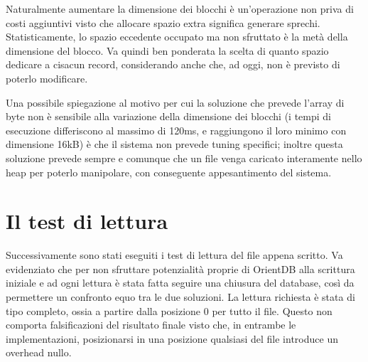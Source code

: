 Naturalmente aumentare la dimensione dei blocchi è un'operazione non priva di costi aggiuntivi visto che allocare spazio extra significa generare sprechi. Statisticamente, lo spazio eccedente occupato ma non sfruttato è la metà della dimensione del blocco. Va quindi ben ponderata la scelta di quanto spazio dedicare a cisacun record, considerando anche che, ad oggi, non è previsto di poterlo modificare.

Una possibile spiegazione al motivo per cui la soluzione che prevede l'array di byte non è sensibile alla variazione della dimensione dei blocchi (i tempi di esecuzione differiscono al massimo di 120ms, e raggiungono il loro minimo con dimensione 16kB) è che il sistema non prevede tuning specifici; inoltre questa soluzione prevede sempre e comunque che un file venga caricato interamente nello heap per poterlo manipolare, con conseguente appesantimento del sistema.

\section{Il test di lettura}
Successivamente sono stati eseguiti i test di lettura del file appena scritto. Va evidenziato che per non sfruttare potenzialità proprie di OrientDB alla scrittura iniziale e ad ogni lettura è stata fatta seguire una chiusura del database, così da permettere un confronto equo tra le due soluzioni. La lettura richiesta è stata di tipo completo, ossia a partire dalla posizione 0 per tutto il file. Questo non comporta falsificazioni del risultato finale visto che, in entrambe le implementazioni, posizionarsi in una posizione qualsiasi del file introduce un overhead nullo.

